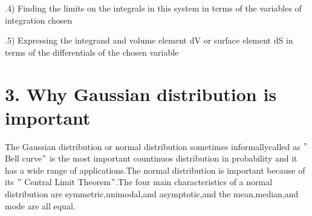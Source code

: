 \documentclass{article}
\begin{document}
.4) Finding the limits on the integrals in this system in terms of the variables of integration chosen

.5) Expressing the integrand and volume element dV or surface element dS in terms of the differentials of the chosen variable

\section*{3. Why Gaussian distribution is important}
\noindent The Gaussian distribution or normal distribution sometimes informallycalled as $"$Bell curve$"$ is the most important countinuos distribution in probability and it has a wide range of applications.The normal distribution is important because of its $"$ Central Limit Theorem$"$.The four main characteristics of a normal distribution are symmetric,unimodal,and asymptotic,and the mean,median,and mode are all equal.
 
\end{document}
